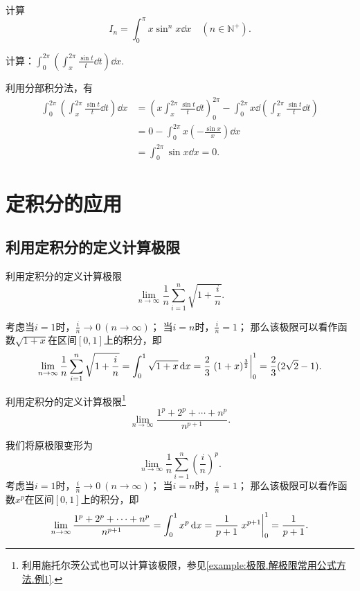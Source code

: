 \begin{example}
计算\[
I_n = \int_0^{\pi} x \sin^n x \dd{x}
\quad(n\in\mathbb{N}^+).
\]
\end{example}

\begin{example}
计算：\(\int_0^{2\pi}\left(\int_x^{2\pi}\frac{\sin t}{t}\dd{t}\right)\dd{x}\).
\begin{solution}
利用分部积分法，有\begin{align*}
\int_0^{2\pi}\left(\int_x^{2\pi}\frac{\sin t}{t}\dd{t}\right)\dd{x}
&= \left(x \int_x^{2\pi}\frac{\sin t}{t}\dd{t}\right)_0^{2\pi}
- \int_0^{2\pi} x \dd(\int_x^{2\pi}\frac{\sin t}{t}\dd{t}) \\
&= 0 - \int_0^{2\pi} x \left(-\frac{\sin x}{x}\right) \dd{x} \\
&= \int_0^{2\pi} \sin x \dd{x} = 0.
\end{align*}
\end{solution}
\end{example}

\section{定积分的应用}
\subsection{利用定积分的定义计算极限}
\begin{example}
\def\l{\lim\limits_{n\to\infty}}%
\def\s{\sum\limits_{i=1}^n}%
利用定积分的定义计算极限\[
\l \frac{1}{n} \s \sqrt{1+\frac{i}{n}}.
\]
\begin{solution}
考虑当\(i=1\)时，\(\frac{i}{n}\to0\ (n\to\infty)\)；%
当\(i=n\)时，\(\frac{i}{n}=1\)；%
那么该极限可以看作函数\(\sqrt{1+x}\)在区间\([0,1]\)上的积分，即\[
\l \frac{1}{n} \s \sqrt{1+\frac{i}{n}}
= \int_0^1 \sqrt{1+x} \dd{x}
= \frac{2}{3} \eval{(1+x)^{\frac{3}{2}}}_0^1
= \frac{2}{3} (2\sqrt{2}-1).
\]
\end{solution}
\end{example}

\begin{example}
\def\l{\lim\limits_{n\to\infty}}%
\def\s{\sum\limits_{i=1}^n}%
利用定积分的定义计算极限\footnote{利用施托尔茨公式也可以计算该极限，参见\cref{example:极限.解极限常用公式方法.例1}.}\[
\l \frac{1^p + 2^p + \dotsb + n^p}{n^{p+1}}.
\]
\begin{solution}
我们将原极限变形为\[
\l \frac{1}{n} \s \left(\frac{i}{n}\right)^p.
\]考虑当\(i=1\)时，\(\frac{i}{n}\to0\ (n\to\infty)\)；%
当\(i=n\)时，\(\frac{i}{n}=1\)；%
那么该极限可以看作函数\(x^p\)在区间\([0,1]\)上的积分，即\[
\l \frac{1^p + 2^p + \dotsb + n^p}{n^{p+1}}
= \int_0^1 x^p \dd{x}
= \frac{1}{p+1} \eval{x^{p+1}}_0^1
= \frac{1}{p+1}.
\]
\end{solution}
\end{example}

